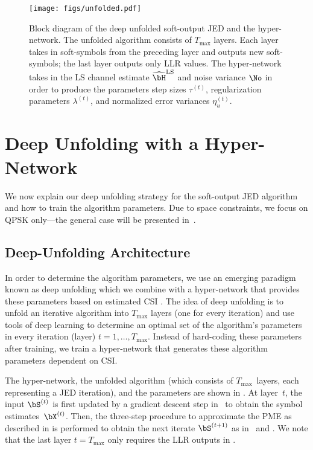 \begin{figure*}[tp]
\centering
\texttt{[image: figs/unfolded.pdf]}
\caption{ 
%
Block diagram of the deep unfolded soft-output JED and the hyper-network.
%
The unfolded algorithm consists of $T_\text{max}$ layers. 
Each layer takes in soft-symbols from the preceding layer and outputs new soft-symbols; the last layer outputs only LLR values.
%
The hyper-network takes in the LS channel estimate $\widehat\bH^{\text{LS}}$ and noise variance $\No$ in order to produce the parameters  step sizes $\tau^{(t)}$, regularization parameters $\lambda^{(t)}$, and normalized error variances $\eta^{(t)}_{u}$. }
\label{fig:overall}
\vspace{-0.2cm}
\end{figure*}
%
\section{Deep Unfolding with a Hyper-Network}\label{sec:hypernetwork}
We now explain our deep unfolding strategy for the soft-output JED algorithm and how to train the algorithm parameters. 
%
Due to space constraints, we focus on QPSK only---the general case will be presented in~\cite{songSJEDfuture}.

\subsection{Deep-Unfolding Architecture}\label{sec:unfolding algorithm}
%
In order to determine the algorithm parameters, we use an emerging paradigm known as deep unfolding \cite{hersheyDeep2014,balatsoukas-stimming19a,mongaAlgorithm2021} which we combine with a hyper-network that provides these parameters based on estimated CSI \cite{goutayDeep2020}.
%
The idea of deep unfolding is to unfold an iterative algorithm into $T_\text{max}$ layers (one for every iteration) and use tools of deep learning to determine an optimal set of the algorithm's parameters in every iteration (layer) $t=1,\ldots,T_\text{max}$. Instead of hard-coding these parameters after training, we train a hyper-network that generates these algorithm parameters dependent on CSI. 
 
The hyper-network, the unfolded algorithm (which consists of $T_\text{max}$~layers, each representing a JED iteration), and the parameters are shown in .
%
At layer~$t$, the input $\bS^{(t)}$ is first updated by a gradient descent step in~ to obtain the symbol estimates~$\bX^{(t)}$.
%
Then, the three-step procedure to approximate the PME as described in  is performed to obtain the next iterate $\bS^{(t+1)}$ as in~ and .
%
We note that the last layer $t=T_\text{max}$ only requires the LLR outputs in .

